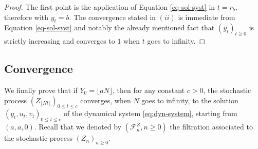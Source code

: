 \documentclass[11pt]{article}
\theoremstyle{remark}
\numberwithin{equation}{section}
\begin{document}
\begin{proof}
 The first point is the application of Equation \eqref{eq-sol-syst} in $t=r_b$, therefore with $y_t=b$.   The convergence stated in $(ii)$ is immediate from Equation \eqref{eq-sol-syst} and notably the already mentioned fact that $(y_t)_{t\geq0}$ is strictly increasing and converges to $1$ when $t$ goes to infinity. 
\end{proof}


\subsection{Convergence}
We finally prove that if $Y_0=\lfloor aN\rfloor$, then for any constant $c>0$, the stochastic process $(Z_{\lfloor Nt\rfloor})_{0\leq t\leq c}$ converges, when $N$ goes to infinity, to the solution $(y_t,u_t,v_t)_{0\leq t \leq c}$ of the dynamical system \eqref{eq:dyn-system}, starting from $(a,a,0)$. Recall that we denoted by $(\mathcal{F}^Z_n,n\geq 0)$ the filtration associated to the stochastic process $(Z_n)_{n\geq 0}$.
\end{document}
